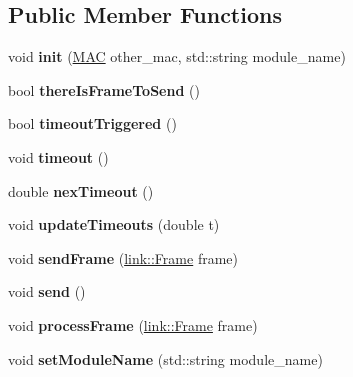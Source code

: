 \subsection*{Public Member Functions}
\begin{DoxyCompactItemize}
\item 
void {\bfseries init} (\hyperlink{structMAC}{M\+AC} other\+\_\+mac, std\+::string module\+\_\+name)\hypertarget{classswp__protocol_ac75ad403a0e67ee52f55845a5649daf8}{}\label{classswp__protocol_ac75ad403a0e67ee52f55845a5649daf8}

\item 
bool {\bfseries there\+Is\+Frame\+To\+Send} ()\hypertarget{classswp__protocol_a573d06b53b641a8f9354956e1aae8d42}{}\label{classswp__protocol_a573d06b53b641a8f9354956e1aae8d42}

\item 
bool {\bfseries timeout\+Triggered} ()\hypertarget{classswp__protocol_ae5bb244e5dd8eb44cd2550ca270ee80b}{}\label{classswp__protocol_ae5bb244e5dd8eb44cd2550ca270ee80b}

\item 
void {\bfseries timeout} ()\hypertarget{classswp__protocol_af7e9869bf57452799f53effa6cb02ddd}{}\label{classswp__protocol_af7e9869bf57452799f53effa6cb02ddd}

\item 
double {\bfseries nex\+Timeout} ()\hypertarget{classswp__protocol_ae9dca95b848d2c6c3c2f429152ae0929}{}\label{classswp__protocol_ae9dca95b848d2c6c3c2f429152ae0929}

\item 
void {\bfseries update\+Timeouts} (double t)\hypertarget{classswp__protocol_abe07df0326dbf0b8d5c1a59b1e4f6dc7}{}\label{classswp__protocol_abe07df0326dbf0b8d5c1a59b1e4f6dc7}

\item 
void {\bfseries send\+Frame} (\hyperlink{structlink_1_1Frame}{link\+::\+Frame} frame)\hypertarget{classswp__protocol_a6d5c49fbcaf4d540ee065b862df339ae}{}\label{classswp__protocol_a6d5c49fbcaf4d540ee065b862df339ae}

\item 
void {\bfseries send} ()\hypertarget{classswp__protocol_a25a7db2cad83583871ae98437b360847}{}\label{classswp__protocol_a25a7db2cad83583871ae98437b360847}

\item 
void {\bfseries process\+Frame} (\hyperlink{structlink_1_1Frame}{link\+::\+Frame} frame)\hypertarget{classswp__protocol_a37f388591cdea5b3cac8a7bf3a829e2b}{}\label{classswp__protocol_a37f388591cdea5b3cac8a7bf3a829e2b}

\item 
void {\bfseries set\+Module\+Name} (std\+::string module\+\_\+name)\hypertarget{classswp__protocol_aad7851e8e2708a8e23eaf1a6fa8637c8}{}\label{classswp__protocol_aad7851e8e2708a8e23eaf1a6fa8637c8}

\end{DoxyCompactItemize}
